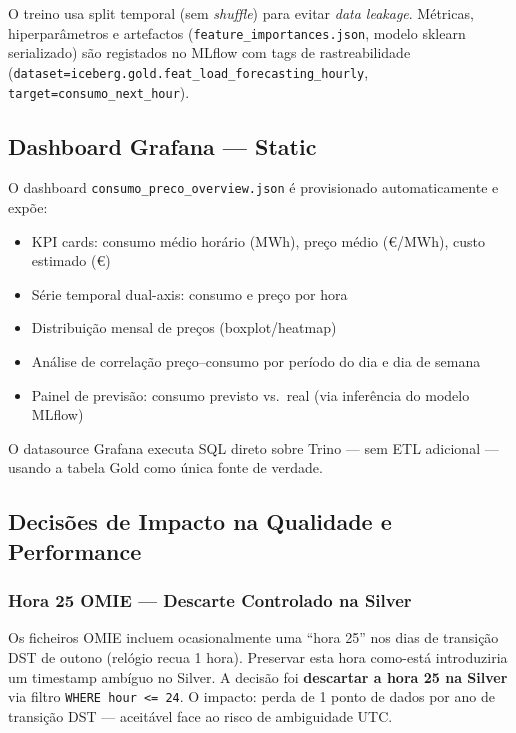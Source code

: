 \documentclass[11pt,a4paper]{article}
\begin{document}
O treino usa split temporal (sem \textit{shuffle}) para evitar \textit{data leakage}. Métricas, hiperparâmetros e artefactos (\texttt{feature\_importances.json}, modelo sklearn serializado) são registados no MLflow com tags de rastreabilidade (\texttt{dataset=iceberg.gold.feat\_load\_forecasting\_hourly}, \texttt{target=consumo\_next\_hour}).

\subsection{Dashboard Grafana — Static}

O dashboard \texttt{consumo\_preco\_overview.json} é provisionado automaticamente e expõe:

\begin{itemize}[leftmargin=*,noitemsep]
  \item KPI cards: consumo médio horário (MWh), preço médio (€/MWh), custo estimado (€)
  \item Série temporal dual-axis: consumo e preço por hora
  \item Distribuição mensal de preços (boxplot/heatmap)
  \item Análise de correlação preço--consumo por período do dia e dia de semana
  \item Painel de previsão: consumo previsto vs.\ real (via inferência do modelo MLflow)
\end{itemize}

O datasource Grafana executa SQL direto sobre Trino — sem ETL adicional — usando a tabela Gold como única fonte de verdade.

\subsection{Decisões de Impacto na Qualidade e Performance}

\subsubsection{Hora 25 OMIE — Descarte Controlado na Silver}

Os ficheiros OMIE incluem ocasionalmente uma ``hora 25'' nos dias de transição DST de outono (relógio recua 1 hora). Preservar esta hora como-está introduziria um timestamp ambíguo no Silver. A decisão foi \textbf{descartar a hora 25 na Silver} via filtro \texttt{WHERE hour <= 24}. O impacto: perda de 1 ponto de dados por ano de transição DST — aceitável face ao risco de ambiguidade UTC.
\end{document}
